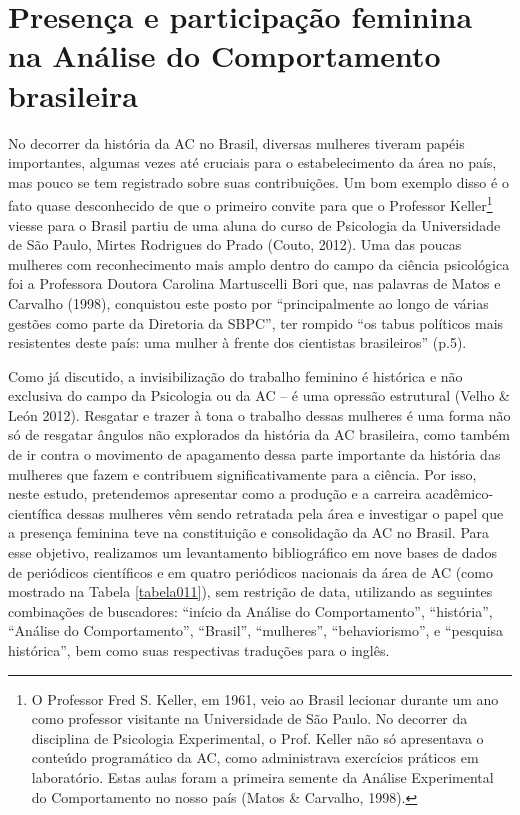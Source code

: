 \section*{Presença e participação feminina na Análise do Comportamento brasileira}

No decorrer da história da AC no Brasil, diversas mulheres tiveram papéis importantes, algumas vezes até cruciais para o estabelecimento da área no país, mas pouco se tem registrado sobre suas contribuições. Um bom exemplo disso é o fato quase desconhecido de que o primeiro convite para que o Professor Keller\footnote{O Professor Fred S. Keller, em 1961, veio ao Brasil lecionar durante um ano como professor visitante na Universidade de São Paulo. No decorrer da disciplina de Psicologia Experimental, o Prof. Keller não só apresentava o conteúdo programático da AC, como administrava exercícios práticos em laboratório. Estas aulas foram a primeira semente da Análise Experimental do Comportamento no nosso país (Matos \& Carvalho, 1998).} viesse para o Brasil partiu de uma aluna do curso de Psicologia da Universidade de São Paulo, Mirtes Rodrigues do Prado (Couto, 2012). Uma das poucas mulheres com reconhecimento mais amplo dentro do campo da ciência psicológica foi a Professora Doutora Carolina Martuscelli Bori que, nas palavras de Matos e Carvalho (1998), conquistou este posto por ``principalmente ao longo de várias gestões como parte da Diretoria da SBPC'', ter rompido ``os tabus políticos mais resistentes deste país: uma mulher à frente dos cientistas brasileiros'' (p.5).

Como já discutido, a invisibilização do trabalho feminino é histórica e não exclusiva do campo da Psicologia ou da AC – é uma opressão estrutural (Velho \& León 2012). Resgatar e trazer à tona o trabalho dessas mulheres é uma forma não só de resgatar ângulos não explorados da história da AC brasileira, como também de ir contra o movimento de apagamento dessa parte importante da história das mulheres que fazem e contribuem significativamente para a ciência. Por isso, neste estudo, pretendemos apresentar como a produção e a carreira acadêmico-científica dessas mulheres vêm sendo retratada pela área e investigar o papel que a presença feminina teve na constituição e consolidação da AC no Brasil. Para esse objetivo, realizamos um levantamento bibliográfico em nove bases de dados de periódicos científicos e em quatro periódicos nacionais da área de AC (como mostrado na Tabela \ref{tabela011}), sem restrição de data, utilizando as seguintes combinações de buscadores: ``início da Análise do Comportamento'', ``história'', ``Análise do Comportamento'', ``Brasil'', ``mulheres'', ``behaviorismo'', e ``pesquisa histórica'', bem como suas respectivas traduções para o inglês.

